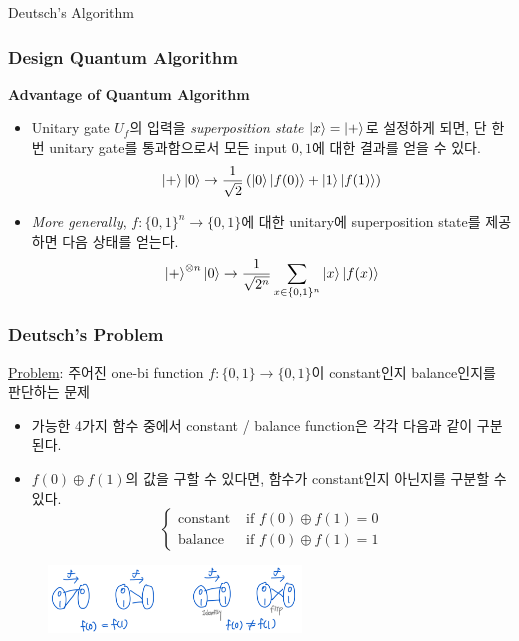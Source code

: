 \documentclass[9pt]{beamer}
\begin{document}
\begin{section}{Deutsch's Algorithm}
        \begin{frame}
            \frametitle{Design Quantum Algorithm}
            \textbf{Advantage of Quantum Algorithm}
            
            \begin{itemize}
                \item Unitary gate $U_f$의 입력을 \textit{superposition state} $\ket x = \ket +$로 설정하게 되면, 단 한번 unitary gate를 통과함으로서 모든 input $0, 1$에 대한 결과를 얻을 수 있다.
                $$\ket + \ket 0 \rightarrow \frac{1}{\sqrt{2}} \left( \ket 0 \ket{f(0)} + \ket 1 \ket{f(1)} \right) $$
                \item \textit{More generally}, $f: \{0, 1\}^n \rightarrow \{0, 1\}$에 대한 unitary에 superposition state를 제공하면 다음 상태를 얻는다.
                $$\ket +^{\otimes n} \ket 0 \rightarrow \frac{1}{\sqrt{2^n}}\sum_{x \in \{0, 1\}^n} \ket x \ket{f(x)}$$
            \end{itemize}
            
        \end{frame}

        \begin{frame}
            \frametitle{Deutsch's Problem}
            \underline{Problem}: 주어진 one-bi function $f: \{0, 1\} \rightarrow \{0, 1\}$이 constant인지 balance인지를 판단하는 문제
            \vspace{0.2cm}
            \begin{itemize}
                \item 가능한 4가지 함수 중에서 constant / balance function은 각각 다음과 같이 구분된다.
                \item $f(0) \oplus f(1)$의 값을 구할 수 있다면, 함수가 constant인지 아닌지를 구분할 수 있다.
                $$ \begin{cases} \text{constant} & \text{ if } f(0)\oplus f(1) = 0  \\ \text{balance} & \text{ if } f(0)\oplus f(1) = 1 \end{cases}$$
            \end{itemize}
            \begin{figure}
                \includegraphics[width=0.6\textwidth]{image/L5_Deutsh.png}
            \end{figure}
        \end{frame}


\end{section}
\end{document}
